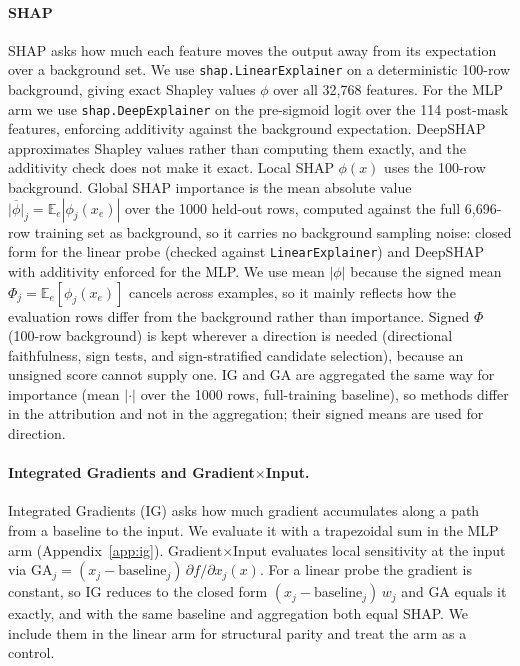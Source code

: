 \paragraph{SHAP} SHAP asks how much each feature moves the output away from its expectation over a background set. We use \texttt{shap.\allowbreak LinearExplainer} on a deterministic 100-row background, giving exact Shapley values $\phi$ over all 32,768 features. For the MLP arm we use \texttt{shap.\allowbreak DeepExplainer} on the pre-sigmoid logit over the 114 post-mask features, enforcing additivity against the background expectation. DeepSHAP approximates Shapley values rather than computing them exactly, and the additivity check does not make it exact. Local SHAP $\phi(x)$ uses the 100-row background. Global SHAP importance is the mean absolute value $\overline{|\phi|}_j=\mathbb{E}_e|\phi_j(x_e)|$ over the 1000 held-out rows, computed against the full 6{,}696-row training set as background, so it carries no background sampling noise: closed form for the linear probe (checked against \texttt{LinearExplainer}) and DeepSHAP with additivity enforced for the MLP. We use mean $|\phi|$ because the signed mean $\Phi_j=\mathbb{E}_e[\phi_j(x_e)]$ cancels across examples, so it mainly reflects how the evaluation rows differ from the background rather than importance. Signed $\Phi$ (100-row background) is kept wherever a direction is needed (directional faithfulness, sign tests, and sign-stratified candidate selection), because an unsigned score cannot supply one. IG and GA are aggregated the same way for importance (mean $|\cdot|$ over the 1000 rows, full-training baseline), so methods differ in the attribution and not in the aggregation; their signed means are used for direction.

\paragraph{Integrated Gradients and Gradient$\times$Input.} Integrated Gradients (IG) asks how much gradient accumulates along a path from a baseline to the input. We evaluate it with a trapezoidal sum in the MLP arm (Appendix~\ref{app:ig}). Gradient$\times$Input evaluates local sensitivity at the input via $\text{GA}_j = (x_j - \text{baseline}_j)\,\partial f/\partial x_j(x)$. For a linear probe the gradient is constant, so IG reduces to the closed form $(x_j - \text{baseline}_j)\,w_j$ and GA equals it exactly, and with the same baseline and aggregation both equal SHAP. We include them in the linear arm for structural parity and treat the arm as a control.

